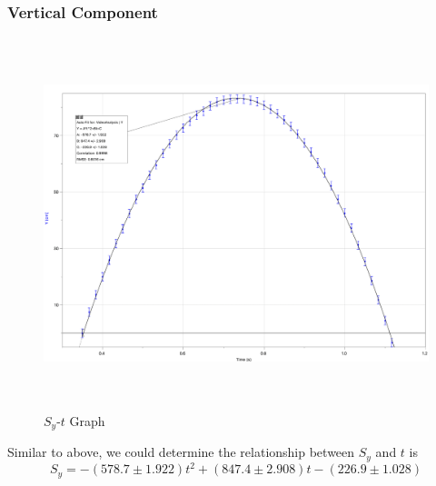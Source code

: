 \documentclass[12pt,a4paper]{article}
\begin{document}
\begin{spacing}{1.25}
\subsubsection{Vertical Component}
\begin{figure}[H]
    \centering
    \includegraphics[width=15.9cm, height=10.8cm]{Sy-t.png}
    \caption{\({S_y}\)-$t$ Graph}
    \label{fig2}
\end{figure}
Similar to above, we could determine the relationship between \(S_y\) and \(t\) is
\[
    S_y = -(578.7 \pm 1.922) t ^ 2 + (847.4 \pm 2.908)t -(226.9 \pm 1.028)
\]

\end{spacing}
\end{document}
